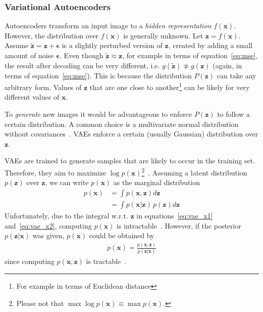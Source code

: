 \subsubsection{Variational Autoencoders}

Autoencoders transform an input image to a \textit{hidden representation} $f(\mathbf{x})$.
However, the distribution over $f(\mathbf{x})$ is generally unknown.
Let $\mathbf{z} = f(\mathbf{x})$.
Assume $\mathbf{\tilde{z}} = \mathbf{z} + \mathbf{\epsilon}$ is a slightly perturbed version of $\mathbf{z}$, created by adding a small amount of noise $\mathbf{\epsilon}$.
Even though $\mathbf{\tilde{z}} \approx \mathbf{z}$, for example in terms of equation~\ref{eq:mse}, the result after decoding can be very different, i.e. $g(\mathbf{\tilde{z}}) \not\approx g(\mathbf{z})$ (again, in terms of equation~\ref{eq:mse}).
This is because the distribution $P(\mathbf{z})$ can take any arbitrary form.
Values of $\mathbf{z}$ that are one close to another\footnote{For example in terms of Euclidean distance} can be likely for very different values of $\mathbf{x}$.

To \textit{generate} new images it would be advantageous to enforce $P(\mathbf{z})$ to follow a certain distribution.
A common choice is a multivariate normal distribution without covariances~\citep[pp. 24, 25]{kingma2019introduction}.
\acp{VAE} enforce a certain (usually Gaussian) distribution over $\mathbf{z}$.

\acp{VAE} are trained to generate samples that are likely to occur in the training set.
Therefore, they aim to maximize $\log p(\mathbf{x})$\footnote{Please not that $\max \log  p(\mathbf{x}) \equiv \max  p(\mathbf{x})$.}~\citep[p. 18]{kingma2019introduction}.
Assuming a latent distribution $p(\mathbf{z})$ over $\mathbf{z}$, we can write $p(\mathbf{x})$ as the marginal distribution
\begin{align}
    p(\mathbf{x}) &= \int p(\mathbf{x}, \mathbf{z})d\mathbf{z} \label{eq:vae_x1}\\
    &= \int p(\mathbf{x}|\mathbf{z})\,p(\mathbf{z})d\mathbf{z} \label{eq:vae_x2}
\end{align}
Unfortunately, due to the integral w.r.t. $\mathbf{z}$ in equations~\ref{eq:vae_x1} and~\ref{eq:vae_x2}, computing $p(\mathbf{x})$ is intractable~\citep[p. 13]{kingma2019introduction}.
However, if the posterior $p(\mathbf{z}|\mathbf{x})$ was given, $p(\mathbf{x})$ could be obtained by
\begin{align}
    p(\mathbf{x}) = \frac{p(\mathbf{x}, \mathbf{z})}{p(\mathbf{z}|\mathbf{x})}
\end{align}
since computing $p(\mathbf{x}, \mathbf{z})$ is tractable~\citep[p. 14]{kingma2019introduction}.

